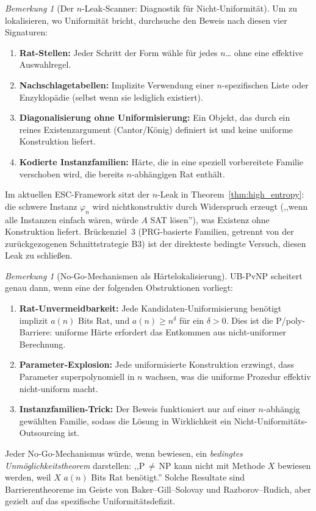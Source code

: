 \documentclass[aps,prd,twocolumn,superscriptaddress,nofootinbib]{revtex4-2}
\theoremstyle{definition}
\theoremstyle{remark}
\newtheorem{remark}[theorem]{Bemerkung}
\begin{document}
\begin{remark}[Der $n$-Leak-Scanner: Diagnostik für Nicht-Uniformität]\label{rem:n-leak}
Um zu lokalisieren, wo Uniformität bricht, durchsuche den Beweis nach diesen vier Signaturen:
\begin{enumerate}
\item \textbf{Rat-Stellen:} Jeder Schritt der Form \glqq wähle für jedes $n$\ldots\grqq{} ohne eine effektive Auswahlregel.
\item \textbf{Nachschlagetabellen:} Implizite Verwendung einer $n$-spezifischen Liste oder Enzyklopädie (selbst wenn sie \glqq lediglich existiert\grqq{}).
\item \textbf{Diagonalisierung ohne Uniformisierung:} Ein Objekt, das durch ein reines Existenzargument (Cantor/König) definiert ist und keine uniforme Konstruktion liefert.
\item \textbf{Kodierte Instanzfamilien:} Härte, die in eine speziell vorbereitete Familie verschoben wird, die bereits $n$-abhängigen Rat enthält.
\end{enumerate}
Im aktuellen ESC-Framework sitzt der $n$-Leak in Theorem~\ref{thm:high_entropy}: die schwere Instanz $\varphi_n$ wird nichtkonstruktiv durch Widerspruch erzeugt (,,wenn alle Instanzen einfach wären, würde $A$ SAT lösen''), was Existenz ohne Konstruktion liefert. Brückenziel~3 (PRG-basierte Familien, getrennt von der zurückgezogenen Schnittstrategie B3) ist der direkteste bedingte Versuch, diesen Leak zu schließen.
\end{remark}

\begin{remark}[No-Go-Mechanismen als Härtelokalisierung]\label{rem:ub-nogo}
UB-PvNP scheitert genau dann, wenn eine der folgenden Obstruktionen vorliegt:
\begin{enumerate}
\item \textbf{Rat-Unvermeidbarkeit:} Jede Kandidaten-Uniformisierung benötigt implizit $a(n)$ Bits Rat, und $a(n) \geq n^\delta$ für ein $\delta > 0$. Dies ist die P/poly-Barriere: uniforme Härte erfordert das Entkommen aus nicht-uniformer Berechnung.
\item \textbf{Parameter-Explosion:} Jede uniformisierte Konstruktion erzwingt, dass Parameter superpolynomiell in $n$ wachsen, was die \glqq uniforme\grqq{} Prozedur effektiv nicht-uniform macht.
\item \textbf{Instanzfamilien-Trick:} Der Beweis funktioniert nur auf einer $n$-abhängig gewählten Familie, sodass die \glqq Lösung\grqq{} in Wirklichkeit ein Nicht-Uniformitäts-Outsourcing ist.
\end{enumerate}
Jeder No-Go-Mechanismus würde, wenn bewiesen, ein \emph{bedingtes Unmöglichkeitstheorem} darstellen: ,,P$\,\neq\,$NP kann nicht mit Methode $X$ bewiesen werden, weil $X$ $a(n)$ Bits Rat benötigt.'' Solche Resultate sind Barrierentheoreme im Geiste von Baker--Gill--Solovay und Razborov--Rudich, aber gezielt auf das spezifische Uniformitätsdefizit.
\end{remark}
\end{document}
